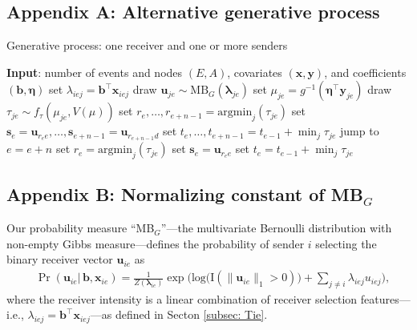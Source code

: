 \documentclass[ba]{imsart}
\numberwithin{equation}{section}
\theoremstyle{plain}
\begin{document}
	\subsection*{Appendix A: Alternative generative process} \label{appendix:alternativeGP}
	\begin{algorithm}[H]
		\SetAlgoLined
		\caption{Generative process: one receiver and one or more senders}
		\begin{algorithmic}
			\STATE \textbf{Input}: number of events and nodes $(E, A)$, covariates $(\boldsymbol{x}, \boldsymbol{y})$, and coefficients $(\boldsymbol{b}, \boldsymbol{\eta})$
			\vskip 0.1in				
			\STATE	set $\lambda_{iej} = {\boldsymbol{b}}^{\top}\boldsymbol{x}_{iej}$
			\ENDFOR
			\STATE	draw $\boldsymbol{u}_{je}  \sim
			\mbox{MB}_G(\boldsymbol{\lambda}_{je})$
			\STATE		set $\mu_{je} = g^{-1}(\boldsymbol{\eta}^\top \boldsymbol{y}_{je})$
			\STATE		draw $\tau_{je} \sim f_\tau(\mu_{je}, V(\mu))$
			\ENDFOR
			\STATE	set ${r}_e,\ldots, r_{e+n-1}=\mbox{argmin}_{j}(\tau_{je})$
			\STATE	set $\boldsymbol{s}_e=\boldsymbol{u}_{r_e e},\ldots,\boldsymbol{s}_{e+n-1}=\boldsymbol{u}_{r_{e+n-1} d}$
			\STATE	set $t_e, \ldots, t_{e+n-1}=t_{e-1} + \min_j\tau_{je}$
			\STATE		jump to $e = e+n$
			\ELSE
			\STATE	set ${r}_e = \mbox{argmin}_{j}(\tau_{je}) $
			\STATE	set $\boldsymbol{s}_e= \boldsymbol{u}_{r_e e}$
			\STATE	set $t_e =t_{e-1} + \min_j\tau_{je}$
			\ENDIF
			\ENDFOR
		\end{algorithmic}
		\label{alg:generative2}
	\end{algorithm}
	\subsection*{Appendix B: Normalizing constant of MB$_{G}$}\label{appendix: non-empty Gibbs measure}
	Our probability measure ``MB$_{G}$''---the multivariate Bernoulli distribution with non-empty Gibbs measure---defines the probability of sender $i$ selecting the binary receiver vector $\boldsymbol{u}_{ie}$ as
	\begin{equation*} 
		\begin{aligned}
			& \Pr(\boldsymbol{u}_{ie}|\,\boldsymbol{b}, \boldsymbol{x}_{ie}) = \frac{1}{Z(\boldsymbol{\lambda}_{ie})}\exp\Big(\mbox{log}\big(\text{I}(\lVert \boldsymbol{u}_{ie} \rVert_1 > 0)\big) + \sum_{j \neq i} \lambda_{iej}u_{iej} \Big),
		\end{aligned}
	\end{equation*}
	where the receiver intensity is a linear combination of receiver selection features---i.e., $\lambda_{iej} = {\boldsymbol{b}}^{\top}\boldsymbol{x}_{iej}$---as defined in Secton \ref{subsec: Tie}.
	
\end{document}
